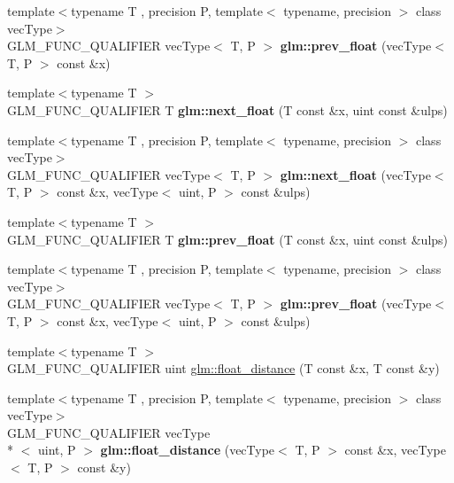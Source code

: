\begin{DoxyCompactItemize}
\item 
\hypertarget{namespaceglm_a90916626e6b0ed925938226f31b38c6b}{{\footnotesize template$<$typename T , precision P, template$<$ typename, precision $>$ class vec\-Type$>$ }\\G\-L\-M\-\_\-\-F\-U\-N\-C\-\_\-\-Q\-U\-A\-L\-I\-F\-I\-E\-R vec\-Type$<$ T, P $>$ {\bfseries glm\-::prev\-\_\-float} (vec\-Type$<$ T, P $>$ const \&x)}\label{namespaceglm_a90916626e6b0ed925938226f31b38c6b}

\item 
\hypertarget{namespaceglm_ae4ffae05b7502be722f522c04f7e42ac}{{\footnotesize template$<$typename T $>$ }\\G\-L\-M\-\_\-\-F\-U\-N\-C\-\_\-\-Q\-U\-A\-L\-I\-F\-I\-E\-R T {\bfseries glm\-::next\-\_\-float} (T const \&x, uint const \&ulps)}\label{namespaceglm_ae4ffae05b7502be722f522c04f7e42ac}

\item 
\hypertarget{namespaceglm_a3ad10c60be0fa0e754c8064ca13c4b91}{{\footnotesize template$<$typename T , precision P, template$<$ typename, precision $>$ class vec\-Type$>$ }\\G\-L\-M\-\_\-\-F\-U\-N\-C\-\_\-\-Q\-U\-A\-L\-I\-F\-I\-E\-R vec\-Type$<$ T, P $>$ {\bfseries glm\-::next\-\_\-float} (vec\-Type$<$ T, P $>$ const \&x, vec\-Type$<$ uint, P $>$ const \&ulps)}\label{namespaceglm_a3ad10c60be0fa0e754c8064ca13c4b91}

\item 
\hypertarget{namespaceglm_a87ac8f75510274e112fe8512cfaa6935}{{\footnotesize template$<$typename T $>$ }\\G\-L\-M\-\_\-\-F\-U\-N\-C\-\_\-\-Q\-U\-A\-L\-I\-F\-I\-E\-R T {\bfseries glm\-::prev\-\_\-float} (T const \&x, uint const \&ulps)}\label{namespaceglm_a87ac8f75510274e112fe8512cfaa6935}

\item 
\hypertarget{namespaceglm_a742d4d85c23906178d1fd0c9fbab266c}{{\footnotesize template$<$typename T , precision P, template$<$ typename, precision $>$ class vec\-Type$>$ }\\G\-L\-M\-\_\-\-F\-U\-N\-C\-\_\-\-Q\-U\-A\-L\-I\-F\-I\-E\-R vec\-Type$<$ T, P $>$ {\bfseries glm\-::prev\-\_\-float} (vec\-Type$<$ T, P $>$ const \&x, vec\-Type$<$ uint, P $>$ const \&ulps)}\label{namespaceglm_a742d4d85c23906178d1fd0c9fbab266c}

\item 
{\footnotesize template$<$typename T $>$ }\\G\-L\-M\-\_\-\-F\-U\-N\-C\-\_\-\-Q\-U\-A\-L\-I\-F\-I\-E\-R uint \hyperlink{group__gtc__ulp_ga2e09bd6c8b0a9c91f6f5683d68245634}{glm\-::float\-\_\-distance} (T const \&x, T const \&y)
\item 
\hypertarget{namespaceglm_a2e00104097b2f3967e97131933595309}{{\footnotesize template$<$typename T , precision P, template$<$ typename, precision $>$ class vec\-Type$>$ }\\G\-L\-M\-\_\-\-F\-U\-N\-C\-\_\-\-Q\-U\-A\-L\-I\-F\-I\-E\-R vec\-Type\\*
$<$ uint, P $>$ {\bfseries glm\-::float\-\_\-distance} (vec\-Type$<$ T, P $>$ const \&x, vec\-Type$<$ T, P $>$ const \&y)}\label{namespaceglm_a2e00104097b2f3967e97131933595309}


\end{DoxyCompactItemize}
